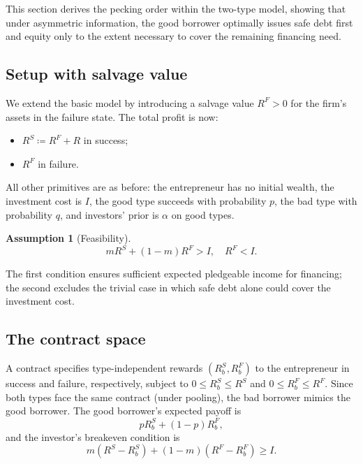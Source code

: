 \documentclass[11pt,a4paper,oneside]{book}
\def\leq{\leqslant}
\def\geq{\geqslant}
\theoremstyle{plain}
\theoremstyle{definition}
\newtheorem{assumption}[theorem]{Assumption}
\theoremstyle{remark}
\numberwithin{equation}{chapter}
\begin{document}
This section derives the pecking order within the two-type model, showing that under asymmetric information, the good borrower optimally issues safe debt first and equity only to the extent necessary to cover the remaining financing need.

\subsection{Setup with salvage value}

We extend the basic model by introducing a salvage value $R^F > 0$ for the firm's assets in the failure state.
The total profit is now:
\begin{itemize}
  \item $R^S \coloneqq R^F + R$ in success;
  \item $R^F$ in failure.
\end{itemize}
All other primitives are as before: the entrepreneur has no initial wealth, the investment cost is $I$, the good type succeeds with probability $p$, the bad type with probability $q$, and investors' prior is $\alpha$ on good types.

\begin{assumption}[Feasibility]\label{ass:pecking}
\begin{equation}\label{eq:pecking-feasibility}
  m R^S + (1 - m) R^F > I,
  \quad R^F < I.
\end{equation}
\end{assumption}

The first condition ensures sufficient expected pledgeable income for financing; the second excludes the trivial case in which safe debt alone could cover the investment cost.

\subsection{The contract space}

A contract specifies type-independent rewards $(R_b^S, R_b^F)$ to the entrepreneur in success and failure, respectively, subject to $0 \leq R_b^S \leq R^S$ and $0 \leq R_b^F \leq R^F$.
Since both types face the same contract (under pooling), the bad borrower mimics the good borrower.
The good borrower's expected payoff is
\begin{equation}\label{eq:pecking-good-payoff}
  p R_b^S + (1 - p) R_b^F,
\end{equation}
and the investor's breakeven condition is
\begin{equation}\label{eq:pecking-breakeven}
  m(R^S - R_b^S) + (1 - m)(R^F - R_b^F) \geq I.
\end{equation}
\end{document}

